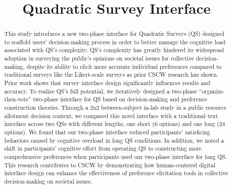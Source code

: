 \documentclass[acmsmall, natbib=false, anonymous=true, screen]{acmart}
\begin{document}

\title{Quadratic Survey Interface}











\renewcommand{\shortauthors}{Ti-Chung Cheng et al.}

\begin{abstract}
This study introduces a new two-phase interface for Quadratic Surveys (QS) designed to scaffold users' decision-making process in order to better manage the cognitive load associated with QS's complexity. QS's complexity has greatly hindered its widespread adoption in surveying the public's opinions on societal issues for collective decision-making, despite its ability to elicit more accurate individual preferences compared to traditional surveys like the Likert-scale surveys as prior CSCW research has shown. Prior work shows that survey interface design significantly influences results and accuracy. To realize QS's full potential, we iteratively designed a two-phase ``organize-then-vote'' two-phase interface for QS based on decision-making and preference construction theories. Through a 2x2 between-subject in-lab study in a public resource allotment decision context, we compared this novel interface with a traditional text interface across two QSs with different lengths, one short (6 options) and one long (24 options). We found that our two-phase interface reduced participants' satisficing behaviors caused by cognitive overload in long QS conditions. In addition, we noted a shift in participants' cognitive effort from operating QS to constructing more comprehensive preferences when participants used our two-phase interface for long QS. This research contributes to CSCW by demonstrating how human-centered digital interface design can enhance the effectiveness of preference elicitation tools in collective decision-making on societal issues.
\end{abstract}
\end{document}
